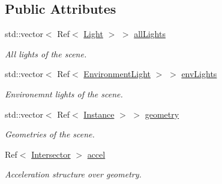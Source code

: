\subsection*{Public Attributes}
\begin{DoxyCompactItemize}
\item 
\hypertarget{classembree_1_1_backend_scene_a126120d3421e2a1be1564d24193c5bdc}{
std::vector$<$ Ref$<$ \hyperlink{classembree_1_1_light}{Light} $>$ $>$ \hyperlink{classembree_1_1_backend_scene_a126120d3421e2a1be1564d24193c5bdc}{allLights}}
\label{classembree_1_1_backend_scene_a126120d3421e2a1be1564d24193c5bdc}

\begin{DoxyCompactList}\small\item\em All lights of the scene. \item\end{DoxyCompactList}\item 
\hypertarget{classembree_1_1_backend_scene_a6511399187567011ef8a6080b53f72ce}{
std::vector$<$ Ref$<$ \hyperlink{classembree_1_1_environment_light}{EnvironmentLight} $>$ $>$ \hyperlink{classembree_1_1_backend_scene_a6511399187567011ef8a6080b53f72ce}{envLights}}
\label{classembree_1_1_backend_scene_a6511399187567011ef8a6080b53f72ce}

\begin{DoxyCompactList}\small\item\em Environemnt lights of the scene. \item\end{DoxyCompactList}\item 
\hypertarget{classembree_1_1_backend_scene_a1430daa53d6ffabea0bdd489cc2af95f}{
std::vector$<$ Ref$<$ \hyperlink{classembree_1_1_instance}{Instance} $>$ $>$ \hyperlink{classembree_1_1_backend_scene_a1430daa53d6ffabea0bdd489cc2af95f}{geometry}}
\label{classembree_1_1_backend_scene_a1430daa53d6ffabea0bdd489cc2af95f}

\begin{DoxyCompactList}\small\item\em Geometries of the scene. \item\end{DoxyCompactList}\item 
\hypertarget{classembree_1_1_backend_scene_ad37065ad50a71732c91b6f8670d96c06}{
Ref$<$ \hyperlink{classembree_1_1_intersector}{Intersector} $>$ \hyperlink{classembree_1_1_backend_scene_ad37065ad50a71732c91b6f8670d96c06}{accel}}
\label{classembree_1_1_backend_scene_ad37065ad50a71732c91b6f8670d96c06}

\begin{DoxyCompactList}\small\item\em Acceleration structure over geometry. \item\end{DoxyCompactList}\end{DoxyCompactItemize}


